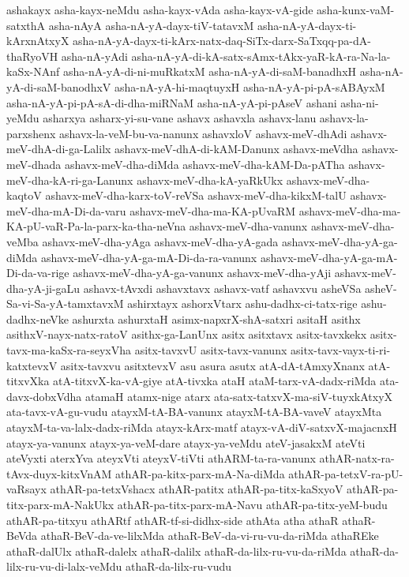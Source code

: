 {ashakayx
asha-kayx-neMdu
asha-kayx-vAda
asha-kayx-vA-gide
asha-kunx-vaM-satxthA
asha-nAyA
asha-nA-yA-dayx-tiV-tatavxM
asha-nA-yA-dayx-ti-kArxnAtxyX
asha-nA-yA-dayx-ti-kArx-natx-daq-SiTx-darx-SaTxqq-pa-dA-thaRyoVH
asha-nA-yAdi
asha-nA-yA-di-kA-satx-sAmx-tAkx-yaR-kA-ra-Na-la-kaSx-NAnf
asha-nA-yA-di-ni-muRkatxM
asha-nA-yA-di-saM-banadhxH
asha-nA-yA-di-saM-banodhxV
asha-nA-yA-hi-maqtuyxH
asha-nA-yA-pi-pA-sABAyxM
asha-nA-yA-pi-pA-sA-di-dha-miRNaM
asha-nA-yA-pi-pAseV
ashani
asha-ni-yeMdu
asharxya
asharx-yi-su-vane
ashavx
ashavxla
ashavx-lanu
ashavx-la-parxshenx
ashavx-la-veM-bu-va-nanunx
ashavxloV
ashavx-meV-dhAdi
ashavx-meV-dhA-di-ga-Lalilx
ashavx-meV-dhA-di-kAM-Danunx
ashavx-meVdha
ashavx-meV-dhada
ashavx-meV-dha-diMda
ashavx-meV-dha-kAM-Da-pATha
ashavx-meV-dha-kA-ri-ga-Lanunx
ashavx-meV-dha-kA-yaRkUkx
ashavx-meV-dha-kaqtoV
ashavx-meV-dha-karx-toV-reVSa
ashavx-meV-dha-kikxM-talU
ashavx-meV-dha-mA-Di-da-varu
ashavx-meV-dha-ma-KA-pUvaRM
ashavx-meV-dha-ma-KA-pU-vaR-Pa-la-parx-ka-tha-neVna
ashavx-meV-dha-vanunx
ashavx-meV-dha-veMba
ashavx-meV-dha-yAga
ashavx-meV-dha-yA-gada
ashavx-meV-dha-yA-ga-diMda
ashavx-meV-dha-yA-ga-mA-Di-da-ra-vanunx
ashavx-meV-dha-yA-ga-mA-Di-da-va-rige
ashavx-meV-dha-yA-ga-vanunx
ashavx-meV-dha-yAji
ashavx-meV-dha-yA-ji-gaLu
ashavx-tAvxdi
ashavxtavx
ashavx-vatf
ashavxvu
asheVSa
asheV-Sa-vi-Sa-yA-tamxtavxM
ashirxtayx
ashorxVtarx
ashu-dadhx-ci-tatx-rige
ashu-dadhx-neVke
ashurxta
ashurxtaH
asimx-napxrX-shA-satxri
asitaH
asithx
asithxV-nayx-natx-ratoV
asithx-ga-LanUnx
asitx
asitxtavx
asitx-tavxkekx
asitx-tavx-ma-kaSx-ra-seyxVha
asitx-tavxvU
asitx-tavx-vanunx
asitx-tavx-vayx-ti-ri-katxtevxV
asitx-tavxvu
asitxtevxV
asu
asura
asutx
atA-dA-tAmxyXnanx
atA-titxvXka
atA-titxvX-ka-vA-giye
atA-tivxka
ataH
ataM-tarx-vA-dadx-riMda
ata-davx-dobxVdha
atamaH
atamx-nige
atarx
ata-satx-tatxvX-ma-siV-tuyxkAtxyX
ata-tavx-vA-gu-vudu
atayxM-tA-BA-vanunx
atayxM-tA-BA-vaveV
atayxMta
atayxM-ta-va-lalx-dadx-riMda
atayx-kArx-matf
atayx-vA-diV-satxvX-majacnxH
atayx-ya-vanunx
atayx-ya-veM-dare
atayx-ya-veMdu
ateV-jasakxM
ateVti
ateVyxti
aterxYva
ateyxVti
ateyxV-tiVti
athARM-ta-ra-vanunx
athAR-natx-ra-tAvx-duyx-kitxVnAM
athAR-pa-kitx-parx-mA-Na-diMda
athAR-pa-tetxV-ra-pU-vaRsayx
athAR-pa-tetxVshacx
athAR-patitx
athAR-pa-titx-kaSxyoV
athAR-pa-titx-parx-mA-NakUkx
athAR-pa-titx-parx-mA-Navu
athAR-pa-titx-yeM-budu
athAR-pa-titxyu
athARtf
athAR-tf-si-didhx-side
athAta
atha
athaR
athaR-BeVda
athaR-BeV-da-ve-lilxMda
athaR-BeV-da-vi-ru-vu-da-riMda
athaREke
athaR-dalUlx
athaR-dalelx
athaR-dalilx
athaR-da-lilx-ru-vu-da-riMda
athaR-da-lilx-ru-vu-di-lalx-veMdu
athaR-da-lilx-ru-vudu
}
